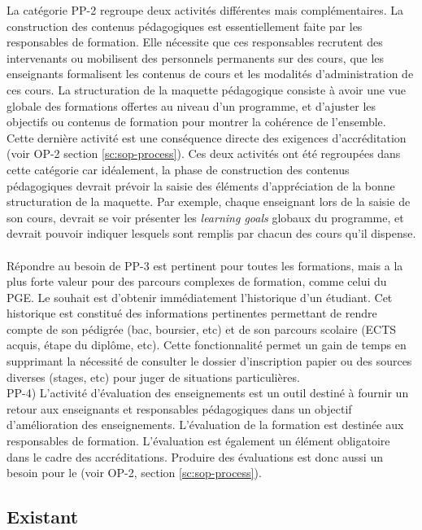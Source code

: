 \documentclass{book}
\begin{document}
La catégorie PP-2  regroupe deux activités différentes  mais complémentaires. La
construction  des  contenus  pédagogiques  est  essentiellement  faite  par  les
responsables de  formation. Elle  nécessite que  ces responsables  recrutent des
intervenants  ou mobilisent  des personnels  permanents sur  des cours,  que les
enseignants formalisent les contenus de  cours et les modalités d'administration
de ces cours.  La structuration de la maquette pédagogique  consiste à avoir une
vue globale des  formations offertes au niveau d'un programme,  et d'ajuster les
objectifs   ou   contenus   de   formation  pour   montrer   la   cohérence   de
l'ensemble. Cette  dernière activité est  une conséquence directe  des exigences
d'accréditation (voir OP-2 section \ref{sc:sop-process}). Ces deux activités ont
été regroupées dans cette catégorie car idéalement, la phase de construction des
contenus pédagogiques devrait  prévoir la saisie des  éléments d'appréciation de
la bonne structuration de la maquette. Par exemple, chaque enseignant lors de la
saisie de son cours, devrait se voir présenter les \emph{learning goals} globaux
du programme, et  devrait pouvoir indiquer lesquels sont remplis  par chacun des
cours qu'il dispense.  ~\\

Répondre au besoin de  PP-3 est pertinent pour toutes les  formations, mais a la
plus forte valeur pour des parcours  complexes de formation, comme celui du PGE.
Le  souhait   est  d'obtenir  immédiatement  l'historique   d'un  étudiant.  Cet
historique  est  constitué des  informations  pertinentes  permettant de  rendre
compte de  son pédigrée (bac, boursier,  etc) et de son  parcours scolaire (ECTS
acquis, étape du diplôme, etc).  Cette fonctionnalité permet un gain de temps en
supprimant  la nécessité  de consulter  le dossier  d'inscription papier  ou des
sources diverses (stages, etc) pour juger de situations particulières.  ~\\

PP-4) L'activité d'évaluation  des enseignements est un outil  destiné à fournir
un  retour  aux  enseignants  et  responsables  pédagogiques  dans  un  objectif
d'amélioration des enseignements. L'évaluation de  la formation est destinée aux
responsables de  formation.  L'évaluation  est également un  élément obligatoire
dans le  cadre des accréditations.  Produire  des évaluations est donc  aussi un
besoin pour le \sop (voir OP-2, section \ref{sc:sop-process}).


\subsection{Existant}
\end{document}
